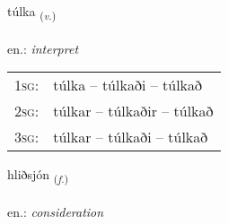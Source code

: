 \documentclass[frontgrid, backgrid]{flacards}\usepackage[]{graphicx}\usepackage[]{xcolor}
\begin{document}
\renewcommand{\flhead}{\vskip5pt \fboxsep=0pt {\small\bfseries\footnotesize Sagnorð | Verb}}
\renewcommand{\fcfoot}{\vskip5pt \fboxsep=0pt \hspace{2pt}{\small\bfseries\footnotesize 2K}}

\renewcommand{\blhead}{\vskip5pt {\small\bfseries\footnotesize Sagnorð | Verb }}
\renewcommand{\bcfoot}{\vskip5pt \hspace{2pt}{\small\bfseries\footnotesize 2K}}


{túlka \small{\textsubscript{(\textit{v.})}} \\[1ex] %
\textphonetic{[tʰul̥ka]} \\
en.: \emph{interpret} \\  [2ex]
\renewcommand*{\arraystretch}{0.8}
\begin{tabular}{p{1cm}l}
\textsc{1sg}: & túlka -- túlkaði -- túlkað \\ 
\textsc{2sg}: & túlkar -- túlkaðir -- túlkað \\ 
\textsc{3sg}: & túlkar -- túlkaði -- túlkað \\ 
\end{tabular}
}

\renewcommand{\flhead}{\vskip5pt \fboxsep=0pt {\small\bfseries\footnotesize Nafnorð | Noun}}
\renewcommand{\fcfoot}{\vskip5pt \fboxsep=0pt \hspace{2pt}{\small\bfseries\footnotesize 2K}}

\renewcommand{\blhead}{\vskip5pt {\small\bfseries\footnotesize Nafnorð | Noun }}
\renewcommand{\bcfoot}{\vskip5pt \hspace{2pt}{\small\bfseries\footnotesize 2K}}


{hliðsjón \small{\textsubscript{(\textit{f.})}} \\[1ex] %
\textphonetic{[l̥ɪðsjoun]} \\
en.: \emph{consideration} \\  [2ex]
\renewcommand*{\arraystretch}{0.8}
}
\end{document}
